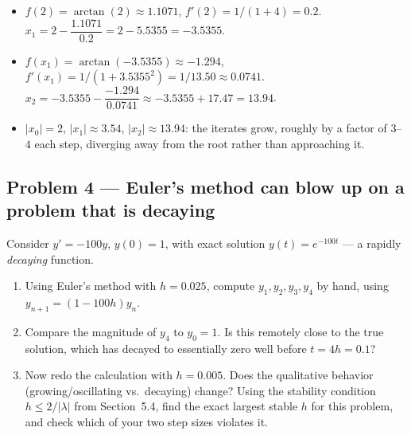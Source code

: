 \solution
\begin{itemize}
\item[(a)] $f(2)=\arctan(2)\approx1.1071$, $f'(2)=1/(1+4)=0.2$. $x_1 = 2 - \dfrac{1.1071}{0.2} = 2-5.5355 = -3.5355$.
\item[(b)] $f(x_1)=\arctan(-3.5355)\approx-1.294$, $f'(x_1) = 1/(1+3.5355^2) = 1/13.50 \approx 0.0741$. $x_2 = -3.5355 - \dfrac{-1.294}{0.0741} \approx -3.5355+17.47 = 13.94$.
\item[(c)] $|x_0|=2$, $|x_1|\approx3.54$, $|x_2|\approx13.94$: the iterates grow, roughly by a factor of $3$--$4$ each step, diverging away from the root rather than approaching it.
\end{itemize}


\subsection*{Problem 4 --- Euler's method can blow up on a problem that is decaying}

Consider $y' = -100y$, $y(0)=1$, with exact solution $y(t)=e^{-100t}$ --- a rapidly \emph{decaying} function.

\begin{enumerate}[label=(\alph*)]
\item Using Euler's method with $h=0.025$, compute $y_1, y_2, y_3, y_4$ by hand, using $y_{n+1}=(1-100h)y_n$.
\item Compare the magnitude of $y_4$ to $y_0=1$. Is this remotely close to the true solution, which has decayed to essentially zero well before $t=4h=0.1$?
\item Now redo the calculation with $h=0.005$. Does the qualitative behavior (growing/oscillating vs.\ decaying) change? Using the stability condition $h\le 2/|\lambda|$ from Section~5.4, find the exact largest stable $h$ for this problem, and check which of your two step sizes violates it.
\end{enumerate}


